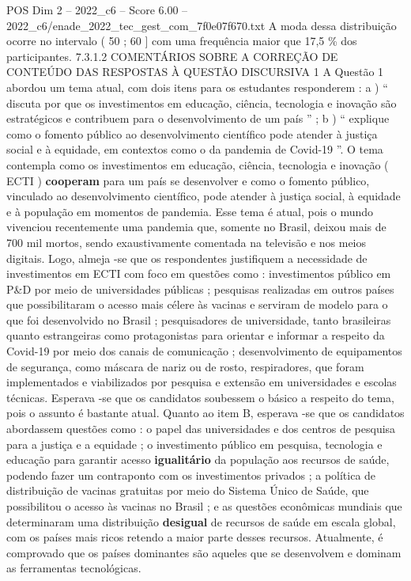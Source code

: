 \begin{textsample}{POS Dim 2 – 2022\_c6 – Score 6.00 – 2022\_c6/enade\_2022\_tec\_gest\_com\_7f0e07f670.txt}
A moda dessa distribuição ocorre no intervalo ( 50 ; 60 ] com uma frequência maior que 17,5 \% dos participantes. 7.3.1.2 COMENTÁRIOS SOBRE A CORREÇÃO DE CONTEÚDO DAS RESPOSTAS À QUESTÃO DISCURSIVA 1 A Questão 1 abordou um tema atual, com dois itens para os estudantes responderem : a ) “ discuta por que os investimentos em educação, ciência, tecnologia e inovação são estratégicos e contribuem para o desenvolvimento de um país ” ; b ) “ explique como o fomento público ao desenvolvimento científico pode atender à justiça social e à equidade, em contextos como o da pandemia de Covid-19 ”.
O tema contempla como os investimentos em educação, ciência, tecnologia e inovação ( ECTI ) \textbf{cooperam} para um país se desenvolver e como o fomento público, vinculado ao desenvolvimento científico, pode atender à justiça social, à equidade e à população em momentos de pandemia.
Esse tema é atual, pois o mundo vivenciou recentemente uma pandemia que, somente no Brasil, deixou mais de 700 mil mortos, sendo exaustivamente comentada na televisão e nos meios digitais.
Logo, almeja -se que os respondentes justifiquem a necessidade de investimentos em ECTI com foco em questões como : investimentos público em P\&D por meio de universidades públicas ; pesquisas realizadas em outros países que possibilitaram o acesso mais célere às vacinas e serviram de modelo para o que foi desenvolvido no Brasil ; pesquisadores de universidade, tanto brasileiras quanto estrangeiras como protagonistas para orientar e informar a respeito da Covid-19 por meio dos canais de comunicação ; desenvolvimento de equipamentos de segurança, como máscara de nariz ou de rosto, respiradores, que foram implementados e viabilizados por pesquisa e extensão em universidades e escolas técnicas.
Esperava -se que os candidatos soubessem o básico a respeito do tema, pois o assunto é bastante atual.
Quanto ao item B, esperava -se que os candidatos abordassem questões como : o papel das universidades e dos centros de pesquisa para a justiça e a equidade ; o investimento público em pesquisa, tecnologia e educação para garantir acesso \textbf{igualitário} da população aos recursos de saúde, podendo fazer um contraponto com os investimentos privados ; a política de distribuição de vacinas gratuitas por meio do Sistema Único de Saúde, que possibilitou o acesso às vacinas no Brasil ; e as questões econômicas mundiais que determinaram uma distribuição \textbf{desigual} de recursos de saúde em escala global, com os países mais ricos retendo a maior parte desses recursos.
Atualmente, é comprovado que os países dominantes são aqueles que se desenvolvem e dominam as ferramentas tecnológicas.

\end{textsample}
